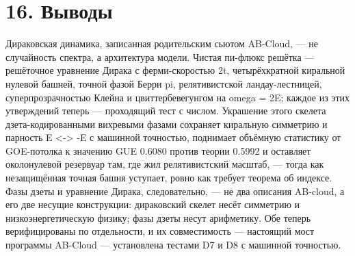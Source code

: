 \documentclass[11pt,a4paper]{article}
\begin{document}
\section{16. Выводы}
Дираковская динамика, записанная родительским сьютом AB-Cloud, --- не случайность спектра, а архитектура модели. Чистая пи-флюкс решётка --- решёточное уравнение Дирака с ферми-скоростью 2t, четырёхкратной киральной нулевой башней, точной фазой Берри pi, релятивистской ландау-лестницей, суперпрозрачностью Клейна и цвиттербевегунгом на omega = 2E; каждое из этих утверждений теперь --- проходящий тест с числом. Украшение этого скелета дзета-кодированными вихревыми фазами сохраняет киральную симметрию и парность E <-> -E с машинной точностью, поднимает объёмную статистику от GOE-потолка к значению GUE 0.6080 против теории 0.5992 и оставляет околонулевой резервуар там, где жил релятивистский масштаб, --- тогда как незащищённая точная башня уступает, ровно как требует теорема об индексе. Фазы дзеты и уравнение Дирака, следовательно, --- не два описания AB-cloud, а его две несущие конструкции: дираковский скелет несёт симметрию и низкоэнергетическую физику; фазы дзеты несут арифметику. Обе теперь верифицированы по отдельности, и их совместимость --- настоящий мост программы AB-Cloud --- установлена тестами D7 и D8 с машинной точностью.
\end{document}
